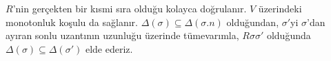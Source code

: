 $R$'nin gerçekten bir kısmi sıra olduğu kolayca doğrulanır. $V$ üzerindeki
  monotonluk koşulu da sağlanır. $\Delta(\sigma)\subseteq\Delta(\sigma.n)$
  olduğundan, $\sigma'$yi $\sigma$'dan ayıran sonlu uzantının uzunluğu
  üzerinde tümevarımla, $R\sigma\sigma'$ olduğunda
  $\Delta(\sigma)\subseteq\Delta(\sigma')$ elde ederiz.

